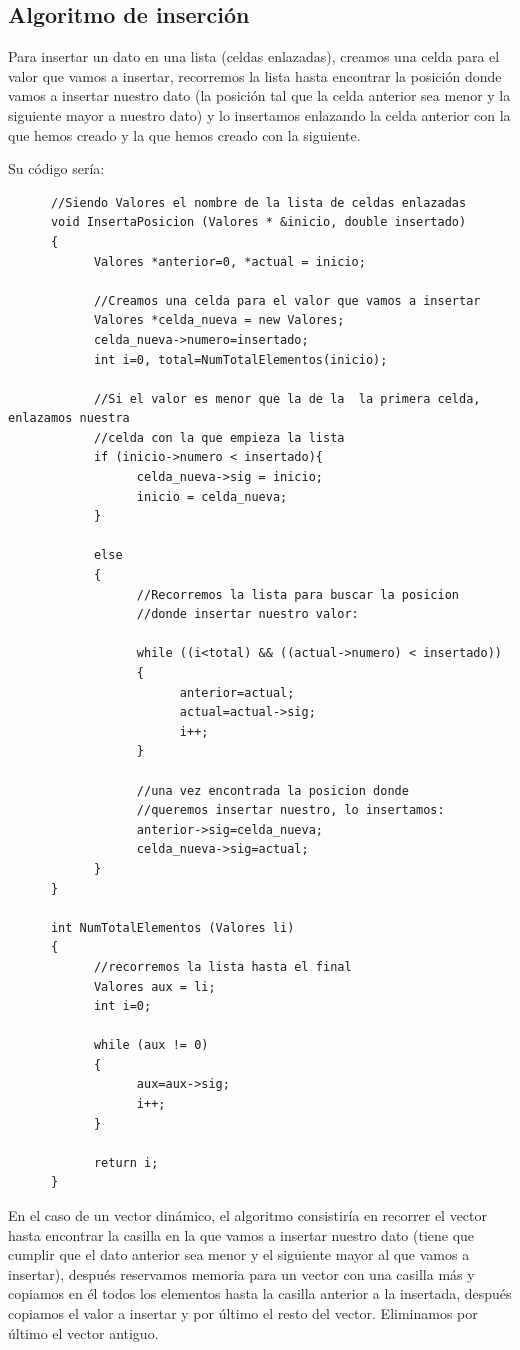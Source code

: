 \documentclass[10pt,a4paper,spanish]{report}
\begin{document}
            \subsection{\textcolor[rgb]{0.5,0.8,0.1}Algoritmo de inserción}
            \noindent
                  Para insertar un dato en una lista (celdas enlazadas), creamos una celda para el valor que vamos a insertar, recorremos la lista hasta encontrar la posición donde vamos a insertar nuestro dato (la posición tal que la celda anterior sea menor y la siguiente mayor a nuestro dato) y lo insertamos enlazando la celda anterior con la que hemos creado y la que hemos creado con la siguiente.

                  \noindent
                  Su código sería:
      \begin{verbatim}
      //Siendo Valores el nombre de la lista de celdas enlazadas
      void InsertaPosicion (Valores * &inicio, double insertado)
      {
            Valores *anterior=0, *actual = inicio;

            //Creamos una celda para el valor que vamos a insertar
            Valores *celda_nueva = new Valores;
            celda_nueva->numero=insertado;
            int i=0, total=NumTotalElementos(inicio);

            //Si el valor es menor que la de la  la primera celda, enlazamos nuestra
            //celda con la que empieza la lista
            if (inicio->numero < insertado){
                  celda_nueva->sig = inicio;
                  inicio = celda_nueva;
            }

            else
            {
                  //Recorremos la lista para buscar la posicion
                  //donde insertar nuestro valor:
                  
                  while ((i<total) && ((actual->numero) < insertado))
                  {
                        anterior=actual;
                        actual=actual->sig;
                        i++;
                  }

                  //una vez encontrada la posicion donde
                  //queremos insertar nuestro, lo insertamos:
                  anterior->sig=celda_nueva;
                  celda_nueva->sig=actual;
            }
      }

      int NumTotalElementos (Valores li)
      {
            //recorremos la lista hasta el final
            Valores aux = li;
            int i=0;

            while (aux != 0)
            {
                  aux=aux->sig;
                  i++;
            }

            return i;
      }
      \end{verbatim}
                  \noindent
                  En el caso de un vector dinámico, el algoritmo consistiría en recorrer el vector hasta encontrar la casilla en la que vamos a insertar nuestro dato (tiene que cumplir que el dato anterior sea menor y el siguiente mayor al que vamos a insertar), después reservamos memoria para un vector con una casilla más y copiamos en él todos los elementos hasta la casilla anterior a la insertada, después copiamos el valor a insertar y por último el resto del vector. Eliminamos por último el vector antiguo.
\end{document}
